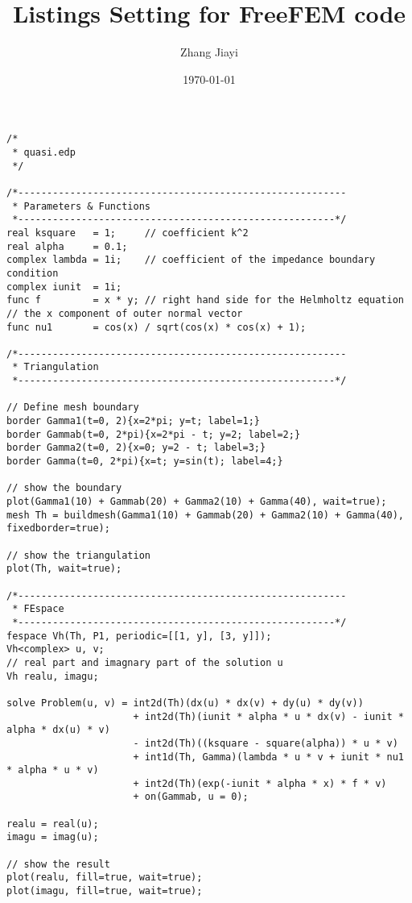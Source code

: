 \documentclass{article}
\title{Listings Setting for FreeFEM code}
\author{Zhang Jiayi}
\date{\today}
\begin{document}
\maketitle

\begin{lstlisting}
/*
 * quasi.edp
 */
            
/*---------------------------------------------------------
 * Parameters & Functions
 *-------------------------------------------------------*/
real ksquare   = 1;     // coefficient k^2
real alpha     = 0.1;
complex lambda = 1i;    // coefficient of the impedance boundary condition
complex iunit  = 1i;
func f         = x * y; // right hand side for the Helmholtz equation
// the x component of outer normal vector
func nu1       = cos(x) / sqrt(cos(x) * cos(x) + 1); 
    
/*---------------------------------------------------------
 * Triangulation
 *-------------------------------------------------------*/
    
// Define mesh boundary
border Gamma1(t=0, 2){x=2*pi; y=t; label=1;}
border Gammab(t=0, 2*pi){x=2*pi - t; y=2; label=2;}
border Gamma2(t=0, 2){x=0; y=2 - t; label=3;}
border Gamma(t=0, 2*pi){x=t; y=sin(t); label=4;}
    
// show the boundary
plot(Gamma1(10) + Gammab(20) + Gamma2(10) + Gamma(40), wait=true); 
mesh Th = buildmesh(Gamma1(10) + Gammab(20) + Gamma2(10) + Gamma(40), fixedborder=true);
    
// show the triangulation
plot(Th, wait=true); 
            
/*---------------------------------------------------------
 * FEspace
 *-------------------------------------------------------*/
fespace Vh(Th, P1, periodic=[[1, y], [3, y]]);
Vh<complex> u, v;
// real part and imagnary part of the solution u
Vh realu, imagu; 
            
solve Problem(u, v) = int2d(Th)(dx(u) * dx(v) + dy(u) * dy(v))
                      + int2d(Th)(iunit * alpha * u * dx(v) - iunit * alpha * dx(u) * v)
                      - int2d(Th)((ksquare - square(alpha)) * u * v)
                      + int1d(Th, Gamma)(lambda * u * v + iunit * nu1 * alpha * u * v)
                      + int2d(Th)(exp(-iunit * alpha * x) * f * v)
                      + on(Gammab, u = 0);
            
realu = real(u);
imagu = imag(u);
            
// show the result
plot(realu, fill=true, wait=true);
plot(imagu, fill=true, wait=true);
\end{lstlisting}
\end{document}
